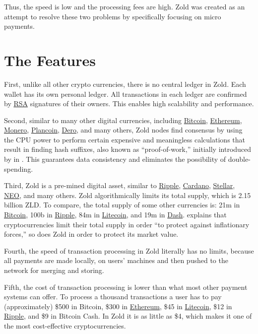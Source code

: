 \documentclass{main}
\begin{document}
Thus, the speed is low and the processing fees are high.
Zold was created as an attempt to resolve these two problems
by specifically focusing on micro payments.

\pagebreak

\section*{The Features}

First, unlike all other crypto currencies, there is no central ledger in Zold.
Each wallet has its own personal ledger.
All transactions in each ledger are confirmed by
\href{https://en.wikipedia.org/wiki/RSA_(cryptosystem)}{RSA} signatures of their owners.
This enables high scalability and performance.

Second, similar to many other digital currencies, including
\href{https://bitcoin.org/}{Bit\-coin},
\href{https://ethereum.org/}{Eth\-ereum},
\href{https://getmonero.org/}{Mone\-ro},
\href{https://plancoin.co/}{Plancoin},
\href{https://dero.io/}{Dero},
and many others, Zold nodes find consensus by using the CPU power to perform certain expensive and meaningless calculations
that result in finding hash suffixes, also known as ``proof-of-work,''
initially introduced by  in \citeyear{back1997}.
This guarantees data consistency and eliminates the possibility of double-spending.

Third, Zold is a pre-mined digital asset, similar to
\href{https://ripple.com/}{Ripple},
\href{https://www.cardano.org/en/home/}{Cardano},
\href{https://www.stellar.org/}{Stellar},
\href{https://neo.org/}{NEO}, and many others.
Zold algorithmically limits its total supply, which is 2.15 billion ZLD.
To compare, the total supply of some other currencies is:
21m in \href{https://bitcoin.org/}{Bitcoin},
100b in \href{https://ripple.com/}{Ripple},
84m in \href{https://litecoin.org/}{Litecoin},
and
19m in \href{https://www.dash.org/}{Dash}.
 explains that cryptocurrencies limit their
total supply in order ``to protect against inflationary forces,''
so does Zold in order to protect its market value.

Fourth, the speed of transaction processing in Zold
literally has no limits, because all payments are made locally, on users'
machines and then pushed to the network for merging and storing.

Fifth, the cost of transaction processing
is lower than what most other payment systems can offer. To process
a thousand transactions a user has to pay (approximately) \$500 in Bitcoin, \$300 in \href{https://ethereum.org/}{Ethereum},
\$45 in \href{https://litecoin.org/}{Litecoin}, \$12 in \href{https://ripple.com/}{Ripple}, and \$9 in Bitcoin Cash.
In Zold it is as little as \$4, which makes it one of the most cost-effective
cryptocurrencies.
\end{document}
